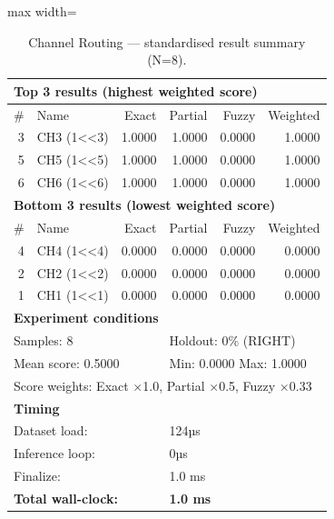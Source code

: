 \begin{table}[htbp]
\centering
\caption{Channel Routing — standardised result summary (N=8).}
\label{tab:channel_routing_summary}
\begin{adjustbox}{max width=\textwidth}
\begin{tabular}{r p{5cm} r r r r}
\toprule
\multicolumn{6}{l}{\textbf{Top 3 results (highest weighted score)}} \\
\midrule
\# & Name & Exact & Partial & Fuzzy & Weighted \\
\midrule
3 & CH3 (1<<3) & 1.0000 & 1.0000 & 0.0000 & 1.0000 \\
5 & CH5 (1<<5) & 1.0000 & 1.0000 & 0.0000 & 1.0000 \\
6 & CH6 (1<<6) & 1.0000 & 1.0000 & 0.0000 & 1.0000 \\
\midrule
\multicolumn{6}{l}{\textbf{Bottom 3 results (lowest weighted score)}} \\
\midrule
\# & Name & Exact & Partial & Fuzzy & Weighted \\
\midrule
4 & CH4 (1<<4) & 0.0000 & 0.0000 & 0.0000 & 0.0000 \\
2 & CH2 (1<<2) & 0.0000 & 0.0000 & 0.0000 & 0.0000 \\
1 & CH1 (1<<1) & 0.0000 & 0.0000 & 0.0000 & 0.0000 \\
\midrule
\multicolumn{6}{l}{\textbf{Experiment conditions}} \\
\midrule
\multicolumn{3}{l}{Samples: 8} & \multicolumn{3}{l}{Holdout: 0\% (RIGHT)} \\
\multicolumn{3}{l}{Mean score: 0.5000} & \multicolumn{3}{l}{Min: 0.0000 \quad Max: 1.0000} \\
\multicolumn{6}{l}{Score weights: Exact $\times$1.0, Partial $\times$0.5, Fuzzy $\times$0.33} \\
\midrule
\multicolumn{6}{l}{\textbf{Timing}} \\
\midrule
\multicolumn{3}{l}{Dataset load:} & \multicolumn{3}{l}{124µs} \\
\multicolumn{3}{l}{Inference loop:} & \multicolumn{3}{l}{0µs} \\
\multicolumn{3}{l}{Finalize:} & \multicolumn{3}{l}{1.0 ms} \\
\multicolumn{3}{l}{\textbf{Total wall-clock:}} & \multicolumn{3}{l}{\textbf{1.0 ms}} \\
\bottomrule
\end{tabular}
\end{adjustbox}
\end{table}
